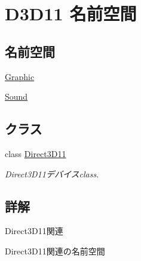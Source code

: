 \hypertarget{namespace_d3_d11}{}\section{D3\+D11 名前空間}
\label{namespace_d3_d11}
\subsection*{名前空間}
\begin{DoxyCompactItemize}
\item 
 \hyperlink{namespace_d3_d11_1_1_graphic}{Graphic}
\item 
 \hyperlink{namespace_d3_d11_1_1_sound}{Sound}
\end{DoxyCompactItemize}
\subsection*{クラス}
\begin{DoxyCompactItemize}
\item 
class \hyperlink{class_d3_d11_1_1_direct3_d11}{Direct3\+D11}
\begin{DoxyCompactList}\small\item\em Direct3\+D11デバイスclass. \end{DoxyCompactList}\end{DoxyCompactItemize}


\subsection{詳解}
Direct3\+D11関連

Direct3\+D11関連の名前空間 